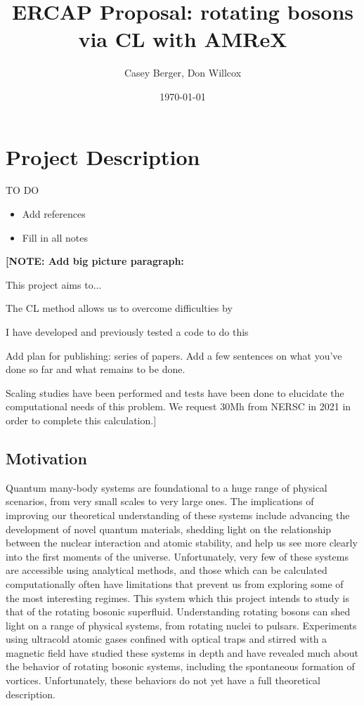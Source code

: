 \documentclass[onecolumn, 12pt]{report}
\title{ERCAP Proposal: rotating bosons via CL with AMReX}
\author{Casey Berger, Don Willcox}
\date{\today}
\newcommand{\note}[1]{{\color{red} \bf[NOTE: #1]}}
\begin{document}
\section{Project Description}
TO DO
\begin{itemize} 
	\item Add references
	\item Fill in all notes
\end{itemize}

\note{Add big picture paragraph:

This project aims to...

The CL method allows us to overcome difficulties by

I have developed and previously tested a code to do this

Add plan for publishing: series of papers. Add a few sentences on what you've done so far and what remains to be done.

Scaling studies have been performed and tests have been done to elucidate the computational needs of this problem. We request 30Mh from NERSC in 2021 in order to complete this calculation.}

\subsection{Motivation}
Quantum many-body systems are foundational to a huge range of physical scenarios, from very small scales to very large ones. The implications of improving our theoretical understanding of these systems include advancing the development of novel quantum materials, shedding light on the relationship between the nuclear interaction and atomic stability, and help us see more clearly into the first moments of the universe. Unfortunately, very few of these systems are accessible using analytical methods, and those which can be calculated computationally often have limitations that prevent us from exploring some of the most interesting regimes. This system which this project intends to study is that of the rotating bosonic superfluid. Understanding rotating bosons can shed light on a range of physical systems, from rotating nuclei to pulsars. Experiments using ultracold atomic gases confined with optical traps and stirred with a magnetic field have studied these systems in depth and have revealed much about the behavior of rotating bosonic systems, including the spontaneous formation of vortices. Unfortunately, these behaviors do not yet have a full theoretical description.
\end{document}

